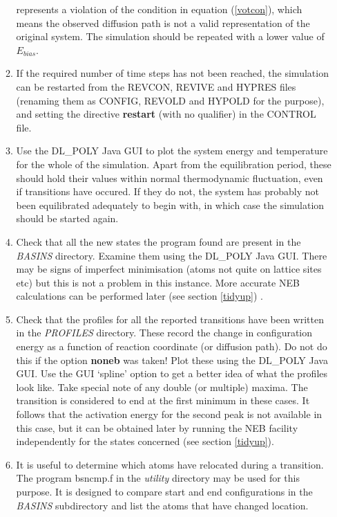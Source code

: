 \begin{enumerate}
\begin{enumerate}
  represents a violation of the condition in equation (\ref{votcon}), which
  means the observed diffusion path is not a valid representation of the
  original system. The simulation should be repeated with a lower value of
  $E_{bias}$.
\item If the required number of time steps has not been reached, the
  simulation can be restarted from the REVCON, REVIVE and HYPRES files
  (renaming them as CONFIG, REVOLD and HYPOLD for the purpose), and
  setting the directive {\bf restart} (with no qualifier) in the CONTROL
  file.
\item Use the DL\_POLY Java GUI to plot the system energy and temperature
  for the whole of the simulation. Apart from the equilibration
  period, these should hold their values within normal thermodynamic
  fluctuation, even if transitions have occured. If they do not, the
  system has probably not been equilibrated adequately to begin with,
  in which case the simulation should be started again.
\item Check that all the new states the program found are present in 
  the {\em BASINS} directory. Examine them using the DL\_POLY Java
  GUI. There may be signs of imperfect minimisation (atoms not quite
  on lattice sites etc) but this is not a problem in this instance.
  More accurate NEB calculations can be performed later (see section
  \ref{tidyup}) .
\item Check that the profiles for all the reported transitions have been
  written in the {\em PROFILES} directory. These record the change in
  configuration energy as a function of reaction coordinate (or
  diffusion path). Do not do this if the option {\bf noneb} was taken!
  Plot these using the DL\_POLY Java GUI. Use the GUI `spline' option
  to get a better idea of what the profiles look like. Take special
  note of any double (or multiple) maxima. The transition is
  considered to end at the first minimum in these cases. It follows
  that the activation energy for the second peak is not available in
  this case, but it can be obtained later by running the NEB facility
  independently for the states concerned (see section \ref{tidyup}).
\item It is useful to determine which atoms have relocated during a
  transition. The program bsncmp.f in the {\em  utility} directory 
  may be used for this purpose. It is designed to compare start and 
  end configurations in the {\em BASINS} subdirectory and list the 
  atoms that have changed location.
\end{enumerate}
\end{enumerate}

